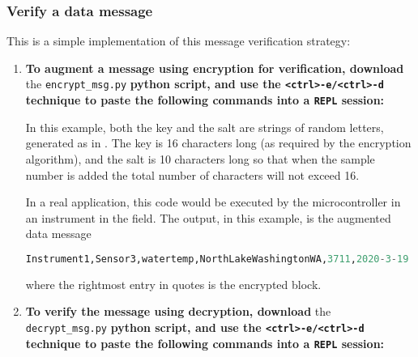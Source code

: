 \subsubsection{\howto Verify a data message}
This is a simple implementation of this message verification strategy:
\begin{enumerate}
	\item \textbf{To augment a message using encryption for verification, download} the \lstinline{encrypt_msg.py} \textbf{python script, and use the \lstinline{<ctrl>-e/<ctrl>-d} technique to paste the following commands into a \texttt{REPL} session:}
	
	
	In this example, both the key and the salt are strings of random letters, generated as in .
	The key is 16 characters long (as required by the encryption algorithm), and the salt is 10 characters long so that when the sample number is added the total number of characters will not exceed 16.
	
	In a real application, this code would be executed by the microcontroller in an instrument in the field.
	The output, in this example, is the augmented data message
\begin{lstlisting}[language=Python]
Instrument1,Sensor3,watertemp,NorthLakeWashingtonWA,3711,2020-3-19 1:20:17,7.6875,b'$\\xd8\\xd8\\xa5\\x93D\\xd1\\xb3\\xd9=\\xa8$x\\xf6n\\xce'
\end{lstlisting}
	where the rightmost entry in quotes is the encrypted block.
	
	\item \textbf{To verify the message using decryption, download} the \lstinline{decrypt_msg.py} \textbf{python script, and use the \lstinline{<ctrl>-e/<ctrl>-d} technique to paste the following commands into a \texttt{REPL} session:}



\end{enumerate}
